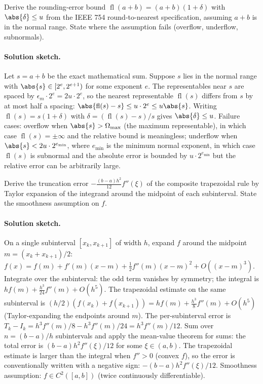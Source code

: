 \begin{exercise}
Derive the rounding-error bound $\operatorname{fl}(a + b) = (a + b)(1 + \delta)$
with $\abs{\delta} \leq u$ from the IEEE 754 round-to-nearest
specification, assuming $a + b$ is in the normal range. State
where the assumption fails (overflow, underflow, subnormals).
\end{exercise}

\paragraph{Solution sketch.}
Let $s = a + b$ be the exact mathematical sum. Suppose $s$ lies in
the normal range with $\abs{s} \in [2^{e}, 2^{e+1})$ for some
exponent $e$. The representables near $s$ are spaced by
$\epsilon_{m} \cdot 2^{e} = 2 u \cdot 2^{e}$, so the nearest
representable $\operatorname{fl}(s)$ differs from $s$ by at most
half a spacing: $\abs{\operatorname{fl}(s) - s} \leq u \cdot 2^{e}
\leq u \abs{s}$. Writing $\operatorname{fl}(s) = s (1 + \delta)$
with $\delta = (\operatorname{fl}(s) - s)/s$ gives
$\abs{\delta} \leq u$. Failure cases: overflow when $\abs{s} >
\Omega_{\max}$ (the maximum representable), in which case
$\operatorname{fl}(s) = \pm \infty$ and the relative bound is
meaningless; underflow when $\abs{s} < 2 u \cdot 2^{e_{\min}}$,
where $e_{\min}$ is the minimum normal exponent, in which case
$\operatorname{fl}(s)$ is subnormal and the absolute error is
bounded by $u \cdot 2^{e_{\min}}$ but the relative error can be
arbitrarily large.

\begin{exercise}
Derive the truncation error $-\frac{(b-a)h^{2}}{12} f''(\xi)$ of
the composite trapezoidal rule by Taylor expansion of the
integrand around the midpoint of each subinterval. State the
smoothness assumption on $f$.
\end{exercise}

\paragraph{Solution sketch.}
On a single subinterval $[x_{k}, x_{k+1}]$ of width $h$, expand
$f$ around the midpoint $m = (x_{k} + x_{k+1})/2$:
$f(x) = f(m) + f'(m)(x - m) + \frac{1}{2} f''(m)(x - m)^{2}
+ O((x-m)^{3})$. Integrate over the subinterval: the odd term
vanishes by symmetry; the integral is
$h f(m) + \frac{h^{3}}{24} f''(m) + O(h^{5})$. The trapezoidal
estimate on the same subinterval is $(h/2)(f(x_{k}) + f(x_{k+1}))
= h f(m) + \frac{h^{3}}{8} f''(m) + O(h^{5})$ (Taylor-expanding
the endpoints around $m$). The per-subinterval error is
$T_{k} - I_{k} = h^{3} f''(m)/8 - h^{3} f''(m)/24
= h^{3} f''(m)/12$. Sum over $n = (b - a)/h$ subintervals and
apply the mean-value theorem for sums: the total error is
$(b - a) h^{2} f''(\xi)/12$ for some $\xi \in (a, b)$. The
trapezoidal estimate is larger than the integral when $f'' > 0$
(convex $f$), so the error is conventionally written with a
negative sign: $-(b-a) h^{2} f''(\xi)/12$. Smoothness assumption:
$f \in C^{2}([a, b])$ (twice continuously differentiable).


